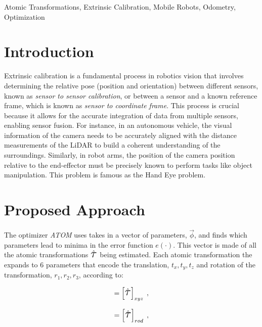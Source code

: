 \documentclass{ieeeaccess}
\newcommand{\Tau}{\scalebox{1.60}{$\tau$}}
\begin{document}
\begin{keywords}
Atomic Transformations, Extrinsic Calibration, Mobile Robots, Odometry, Optimization
\end{keywords}

\titlepgskip=-21pt

\maketitle

\section{Introduction}
\label{sec:introduction}

Extrinsic calibration is a fundamental process in robotics vision that involves determining the
relative pose (position and orientation) between different sensors, known as \textit{sensor to sensor calibration}, or between a sensor and a known reference
frame, which is known as \textit{sensor to coordinate frame}. This process is crucial because it allows for the accurate integration of data from multiple sensors,
enabling sensor fusion. For instance, in an autonomous vehicle, the visual information of the camera
needs to be accurately aligned with the distance measurements of the LiDAR to build a coherent understanding of the
surroundings. Similarly, in robot arms, the position of the camera position relative to the end-effector must be precisely
known to perform tasks like object manipulation. This problem is famous as the Hand Eye problem.

\section{Proposed Approach}

The optimizer \textit{ATOM} uses takes in a vector of parameters, $\vec{\phi}$, and finds which
parameters lead to minima in the error function $e(\cdot)$.
This vector is made of all the atomic transformations $\hat{\mathbf{\Tau}}$ being estimated. Each atomic
transformation the expands to 6 parameters that encode the translation, $t_x,t_y,t_z$ and rotation of the
transformation, $r_1,r_2,r_3$, according to:

\begin{equation}
  [t_x,t_y,t_z] = \left[ \hat{\mathbf{\Tau}} \right]_{xyz}\; ,
\end{equation}

\begin{equation}
  [r_1,r_2,r_3] = \left[ \hat{\mathbf{\Tau}} \right]_{rod}\; ,
\end{equation}
\end{document}
